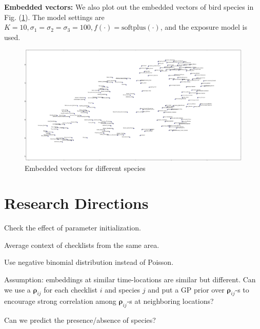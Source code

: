 \documentclass{article}
\newcommand{\wt}{\boldsymbol{\rho}}
\begin{document}
{\bf Embedded vectors:}
We also plot out the embedded vectors of bird species in Fig. (\ref{fig_emb_bird}). 
The model settings are $K = 10, \sigma_1 = \sigma_2 = \sigma_3 = 100, f(\cdot) = \mathrm{softplus}(\cdot)$, and the exposure model is used. 

\begin{figure}[t]
    \centering
    \includegraphics[width=1.0\textwidth]{figures/embedded_birds.png}
    \caption{Embedded vectors for different species}
    \label{fig_emb_bird}
\end{figure}



\section{Research Directions}

Check the effect of parameter initialization. 

Average context of checklists from the same area. 

Use negative binomial distribution instead of Poisson. 

Assumption: embeddings at similar time-locations are similar but different. Can we use a $\wt_{ij}$ for each checklist $i$ and species $j$ and put a GP prior over $\wt_{ij}$-s to encourage strong correlation among $\wt_{ij}$-s at neighboring locations?  

Can we predict the presence/absence of species?
\end{document}

